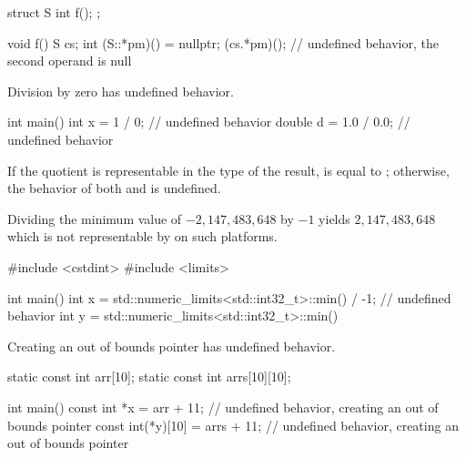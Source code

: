 \pnum
\begin{example}
\begin{codeblock}
struct S {
  int f();
};

void f() {
  S cs;
  int (S::*pm)() = nullptr;
  (cs.*pm)();           // undefined behavior, the second operand is null
}
\end{codeblock}
\end{example}


\pnum
Division by zero has undefined behavior.

\pnum
\begin{example}
\begin{codeblock}
int main() {
  int x = 1 / 0;        // undefined behavior
  double d = 1.0 / 0.0; // undefined behavior
}
\end{codeblock}
\end{example}


\pnum
If the
quotient 
is representable in the type of the result,
is equal to ;
otherwise, the behavior of both  and  is undefined.

\pnum
\begin{example}
Dividing the minimum  value
of $-2,147,483,648$
by $-1$ yields
$2,147,483,648$
which is not representable by 
on such platforms.
\begin{codeblock}
#include <cstdint>
#include <limits>

int main() {
  int x = std::numeric_limits<std::int32_t>::min() / -1;    // undefined behavior
  int y = std::numeric_limits<std::int32_t>::min() %
}
\end{codeblock}
\end{example}


\pnum
Creating an out of bounds pointer has undefined behavior.

\pnum
\begin{example}
\begin{codeblock}
static const int arr[10]{};
static const int arrs[10][10]{};

int main() {
  const int *x = arr + 11;          // undefined behavior, creating an out of bounds pointer
  const int(*y)[10] = arrs + 11;    // undefined behavior, creating an out of bounds pointer
}
\end{codeblock}
\end{example}

